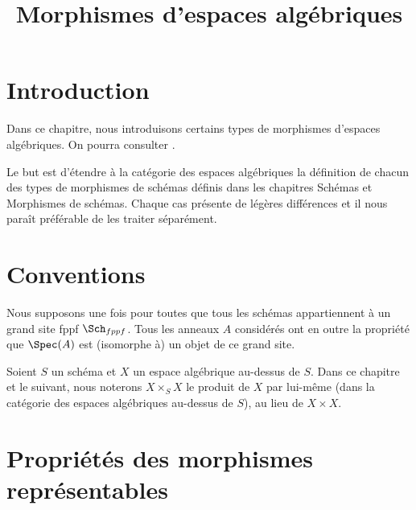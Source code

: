 

%


\title{Morphismes d'espaces algébriques}


\maketitle

\label{section-phantom}

\tableofcontents

\section{Introduction}
\label{section-introduction}

\noindent
Dans ce chapitre, nous introduisons certains types de morphismes d'espaces
algébriques. On pourra consulter \cite{Kn}.

\medskip\noindent
Le but est d'étendre à la catégorie des espaces algébriques la définition
de chacun des types de morphismes de schémas définis dans les chapitres
Schémas et Morphismes de schémas. Chaque cas présente de légères différences
et il nous paraît préférable de les traiter séparément.





\section{Conventions}
\label{section-conventions}

\noindent
Nous supposons une fois pour toutes que tous les schémas appartiennent
à un grand site fppf $\Sch_{fppf}$. Tous les anneaux $A$ considérés
ont en outre la propriété que $\Spec(A)$ est (isomorphe à) un
objet de ce grand site.

\medskip\noindent
Soient $S$ un schéma et $X$ un espace algébrique au-dessus de $S$.
Dans ce chapitre et le suivant, nous noterons $X \times_S X$
le produit de $X$ par lui-même (dans la catégorie des espaces
algébriques au-dessus de $S$), au lieu de $X \times X$.





\section{Propriétés des morphismes représentables}
\label{section-representable}

